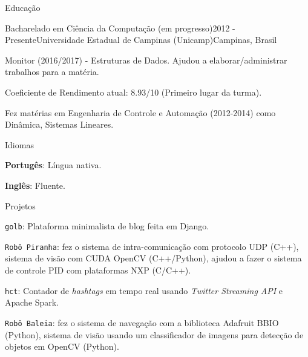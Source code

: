 \documentclass[8pt]{resume}
\newcommand{\tit}[1]{\textit{#1}}
\newcommand{\tbf}[1]{\textbf{#1}}
\newcommand{\ttt}[1]{\texttt{#1}}
\begin{document}
\newpage
\begin{rSection}{Educação}

    \begin{rSubsection}{Bacharelado em Ciência da Computação (em progresso)}{2012 - Presente}{Universidade Estadual de Campinas (Unicamp)}{Campinas, Brasil}
    \item Monitor (2016/2017) - Estruturas de Dados.
        Ajudou a elaborar/administrar trabalhos para a matéria.
    \item Coeficiente de Rendimento atual: 8.93/10 (Primeiro lugar da turma).
    \item Fez matérias em Engenharia de Controle e Automação (2012-2014)
        como Dinâmica, Sistemas Lineares.
    \end{rSubsection}

\end{rSection}

\begin{rSection}{Idiomas}

    \begin{rSubsection}{}{}{}{}
        \item \tbf{Portugês}: Língua nativa.
        \item \tbf{Inglês}: Fluente.
    \end{rSubsection}

\end{rSection}


\begin{rSection}{Projetos}

\begin{rSubsection}{}{}{}{}
    \item \ttt{golb}: Plataforma minimalista de blog feita em Django.
    \item \ttt{Robô Piranha}:
        fez o sistema de intra-comunicação com protocolo UDP (C++),
        sistema de visão com CUDA OpenCV (C++/Python),
        ajudou a fazer o sistema de controle PID com plataformas NXP (C/C++).
    \item \ttt{hct}: Contador de \tit{hashtags} em tempo real usando
        \tit{Twitter Streaming API} e Apache Spark.
    \item \ttt{Robô Baleia}:
        fez o sistema de navegação com a biblioteca Adafruit BBIO (Python),
        sistema de visão usando um classificador de imagens para detecção
        de objetos em OpenCV (Python).
\end{rSubsection}

\end{rSection}
\end{document}

